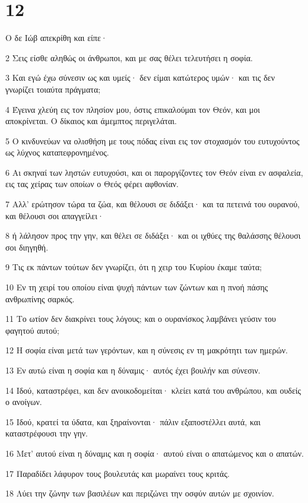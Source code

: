 \chapter{12}

\par Ο δε Ιώβ απεκρίθη και είπε·
\par 2 Σεις είσθε αληθώς οι άνθρωποι, και με σας θέλει τελευτήσει η σοφία.
\par 3 Και εγώ έχω σύνεσιν ως και υμείς· δεν είμαι κατώτερος υμών· και τις δεν γνωρίζει τοιαύτα πράγματα;
\par 4 Έγεινα χλεύη εις τον πλησίον μου, όστις επικαλούμαι τον Θεόν, και μοι αποκρίνεται. Ο δίκαιος και άμεμπτος περιγελάται.
\par 5 Ο κινδυνεύων να ολισθήση με τους πόδας είναι εις τον στοχασμόν του ευτυχούντος ως λύχνος καταπεφρονημένος.
\par 6 Αι σκηναί των ληστών ευτυχούσι, και οι παροργίζοντες τον Θεόν είναι εν ασφαλεία, εις τας χείρας των οποίων ο Θεός φέρει αφθονίαν.
\par 7 Αλλ' ερώτησον τώρα τα ζώα, και θέλουσι σε διδάξει· και τα πετεινά του ουρανού, και θέλουσι σοι απαγγείλει·
\par 8 ή λάλησον προς την γην, και θέλει σε διδάξει· και οι ιχθύες της θαλάσσης θέλουσι σοι διηγηθή.
\par 9 Τις εκ πάντων τούτων δεν γνωρίζει, ότι η χειρ του Κυρίου έκαμε ταύτα;
\par 10 Εν τη χειρί του οποίου είναι ψυχή πάντων των ζώντων και η πνοή πάσης ανθρωπίνης σαρκός.
\par 11 Το ωτίον δεν διακρίνει τους λόγους; και ο ουρανίσκος λαμβάνει γεύσιν του φαγητού αυτού;
\par 12 Η σοφία είναι μετά των γερόντων, και η σύνεσις εν τη μακρότητι των ημερών.
\par 13 Εν αυτώ είναι η σοφία και η δύναμις· αυτός έχει βουλήν και σύνεσιν.
\par 14 Ιδού, καταστρέφει, και δεν ανοικοδομείται· κλείει κατά του ανθρώπου, και ουδείς ο ανοίγων.
\par 15 Ιδού, κρατεί τα ύδατα, και ξηραίνονται· πάλιν εξαποστέλλει αυτά, και καταστρέφουσι την γην.
\par 16 Μετ' αυτού είναι η δύναμις και η σοφία· αυτού είναι ο απατώμενος και ο απατών.
\par 17 Παραδίδει λάφυρον τους βουλευτάς και μωραίνει τους κριτάς.
\par 18 Λύει την ζώνην των βασιλέων και περιζώνει την οσφύν αυτών με σχοινίον.
